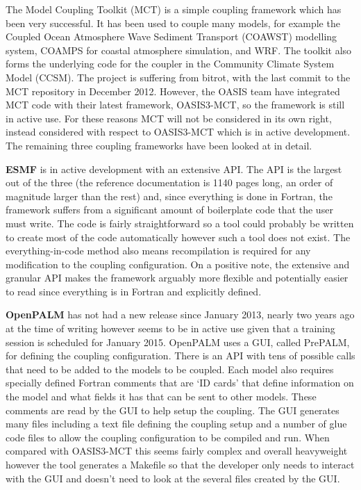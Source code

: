 The Model Coupling Toolkit (MCT) \cite{Larson2005,Jacob2005} is a simple
coupling framework which has been very successful. It has been used to couple
many models, for example the Coupled Ocean Atmosphere Wave Sediment Transport
(COAWST) modelling system, COAMPS for coastal atmosphere simulation, and WRF.
The toolkit also forms the underlying code for the coupler in the Community
Climate System Model (CCSM). The project is suffering from bitrot, with the last
commit to the MCT repository in December 2012. However, the OASIS team have
integrated MCT code with their latest framework, OASIS3-MCT, so the framework is
still in active use. For these reasons MCT will not be considered in its own
right, instead considered with respect to OASIS3-MCT which is in active
development. The remaining three coupling frameworks have been looked at in
detail.

\textbf{ESMF} is in active development with an extensive API. The API is the
largest out of the three (the reference documentation is 1140 pages long, an
order of magnitude larger than the rest) and, since everything is done in
Fortran, the framework suffers from a significant amount of boilerplate code
that the user must write. The code is fairly straightforward so a tool could
probably be written to create most of the code automatically however such a tool
does not exist. The everything-in-code method also means recompilation is
required for any modification to the coupling configuration. On a positive note,
the extensive and granular API makes the framework arguably more flexible and
potentially easier to read since everything is in Fortran and explicitly
defined.

\textbf{OpenPALM} has not had a new release since January 2013, nearly two years
ago at the time of writing however seems to be in active use given that a
training session is scheduled for January 2015. OpenPALM uses a GUI, called
PrePALM, for defining the coupling configuration. There is an API with tens of
possible calls that need to be added to the models to be coupled. Each model
also requires specially defined Fortran comments that are `ID cards' that define
information on the model and what fields it has that can be sent to other
models. These comments are read by the GUI to help setup the coupling. The GUI
generates many files including a text file defining the coupling setup and a
number of glue code files to allow the coupling configuration to be compiled and
run. When compared with OASIS3-MCT this seems fairly complex and overall
heavyweight however the tool generates a Makefile so that the developer only
needs to interact with the GUI and doesn't need to look at the several files
created by the GUI.

